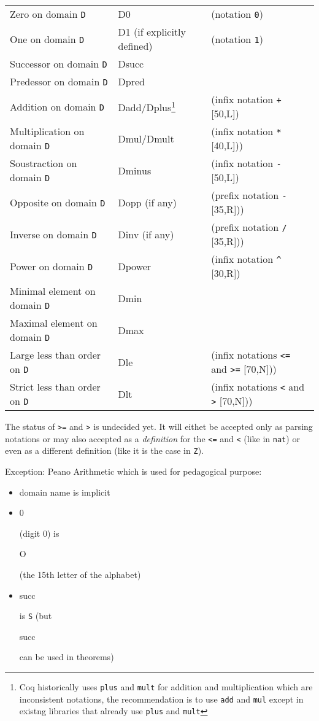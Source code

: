 \documentclass[a4paper]{article}
\newcommand\term[1]{\begin{tt}#1\end{tt}}
\newcommand\D{\texttt{D}}
\begin{document}
\begin{minipage}{6in}
\renewcommand{\thefootnote}{\thempfootnote}  %
\begin{tabular}{lll}
Zero on domain {\D} & D0 & (notation \verb=0=)\\
One on domain {\D} & D1 (if explicitly defined) & (notation \verb=1=)\\
Successor on domain {\D} & Dsucc\\
Predessor on domain {\D} & Dpred\\
Addition on domain {\D} & Dadd/Dplus\footnote{Coq historically uses \texttt{plus} and \texttt{mult} for addition and multiplication which are inconsistent notations, the recommendation is to use \texttt{add} and \texttt{mul} except in existng libraries that already use \texttt{plus} and \texttt{mult}}
 & (infix notation \verb=+= [50,L])\\
Multiplication on domain {\D} & Dmul/Dmult\footnotemark[\value{footnote}] & (infix notation \verb=*= [40,L]))\\
Soustraction on domain {\D} & Dminus & (infix notation \verb=-= [50,L])\\
Opposite on domain {\D} & Dopp (if any) & (prefix notation \verb=-= [35,R]))\\
Inverse on domain {\D} & Dinv (if any) & (prefix notation \verb=/= [35,R]))\\
Power on domain {\D} & Dpower & (infix notation \verb=^= [30,R])\\
Minimal element on domain {\D} & Dmin\\
Maximal element on domain {\D} & Dmax\\
Large less than order on {\D} & Dle & (infix notations \verb!<=! and \verb!>=! [70,N]))\\
Strict less than order on {\D} & Dlt & (infix notations \verb=<= and \verb=>= [70,N]))\\
\end{tabular}
\bigskip
\end{minipage}

\bigskip

The status of \verb!>=! and \verb!>! is undecided yet. It will eithet
be accepted only as parsing notations or may also accepted as a {\em
  definition} for the \verb!<=! and \verb!<! (like in \texttt{nat}) or
even as a different definition (like it is the case in \texttt{Z}).

\bigskip

Exception: Peano Arithmetic which is used for pedagogical purpose:

\begin{itemize}
\item domain name is implicit
\item \term{0} (digit $0$) is \term{O} (the 15th letter of the alphabet)
\item \term{succ} is \verb!S! (but \term{succ} can be used in theorems)
\end{itemize}
\end{document}
